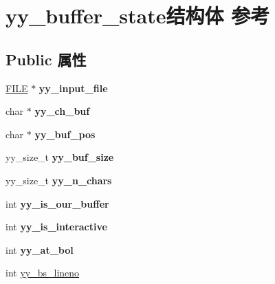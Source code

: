 \hypertarget{structyy__buffer__state}{}\section{yy\+\_\+buffer\+\_\+state结构体 参考}
\label{structyy__buffer__state}
\subsection*{Public 属性}
\begin{DoxyCompactItemize}
\item 
\mbox{\label{structyy__buffer__state_a4360acfb226a1fc240ab2be17dd6beda}} 
\hyperlink{struct__iobuf}{F\+I\+LE} $\ast$ {\bfseries yy\+\_\+input\+\_\+file}
\item 
\mbox{\label{structyy__buffer__state_a0d25458e69eb22207fc633a1255d099d}} 
char $\ast$ {\bfseries yy\+\_\+ch\+\_\+buf}
\item 
\mbox{\label{structyy__buffer__state_a8435c3f786bbb55d21d0174e4cfc22a0}} 
char $\ast$ {\bfseries yy\+\_\+buf\+\_\+pos}
\item 
\mbox{\label{structyy__buffer__state_a48302f5f3477a9c78bbddf56d356ef54}} 
yy\+\_\+size\+\_\+t {\bfseries yy\+\_\+buf\+\_\+size}
\item 
\mbox{\label{structyy__buffer__state_a06406208824817acfec2183b79080945}} 
yy\+\_\+size\+\_\+t {\bfseries yy\+\_\+n\+\_\+chars}
\item 
\mbox{\label{structyy__buffer__state_a80ce2431c70dc4f89ced487f18449465}} 
int {\bfseries yy\+\_\+is\+\_\+our\+\_\+buffer}
\item 
\mbox{\label{structyy__buffer__state_abf5c70eea75581b58c0ee7bd31b14490}} 
int {\bfseries yy\+\_\+is\+\_\+interactive}
\item 
\mbox{\label{structyy__buffer__state_a9d60c60af6e1a6f69de16871fd64f85f}} 
int {\bfseries yy\+\_\+at\+\_\+bol}
\item 
int \hyperlink{structyy__buffer__state_a818e94bc9c766e683c60df1e9fd01199}{yy\+\_\+bs\+\_\+lineno}

\end{DoxyCompactItemize}
